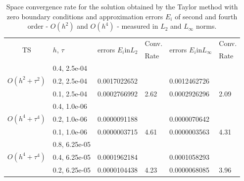 \documentclass[%
 aip,
cp,  
 amsmath,amssymb,
 reprint,
]{iopconfser}
\begin{document}
\begin{table}[ht]
\centering
\small
		\begin{tabular}{||c|l|ll|ll||}
			\hline
			\hline
      \multirow{2  }{*}{TS}        & \multirow{2  }{*}{$h$, $\tau$}  & \multirow{2  }{*}{errors $E_i$in$L_2$}  &Conv.& \multirow{2  }{*}{errors $E_i$in$L_\infty$}  &Conv.  \\
	         &                    &                               & Rate   &                                        & Rate \\
   			\hline 
					\hline 
                                    &0.4, 2.5e-04          &              &              &                     &      \\
      $O(h^2 + \tau^ 2)$ &0.2, 2.5e-04          &0.0017022652 &            &0.0012462726    &       \\
                                   &0.1, 2.5e-04   & 0.0002766992 & 2.62    &0.0002926296    &  2.09      \\
			\hline 
                                  &0.4, 1.0e-06        &             &            &           &   \\
   $O(h^4+ \tau^4)$   &0.2, 1.0e-06       &  0.0000091188  &            &0.0000070642 &   \\
                                  &0.1, 1.0e-06  &0.0000003715   &4.61  &0.0000003563  & 4.31 \\
			\hline
                                 &0.8, 6.25e-05    &            &               &             &    \\
 $O(h^4+ \tau^4)$    &0.4, 6.25e-05     & 0.0001962184   &        &  0.0001058293   &   \\
                                &0.2, 6.25e-05   &0.0000104438 & 4.23  & 0.0000068085  & 3.96  \\
    \hline
			\hline 
		\end{tabular}
		\caption{Space convergence rate for the solution obtained by the Taylor method with zero boundary conditions and approximation errors $E_i$ of second and fourth order - $O(h^{2})$ and $O(h^{4})$ - measured in $L_2$ and $L_\infty$ norms.}
\label{tableA}
\end{table}
\end{document}
